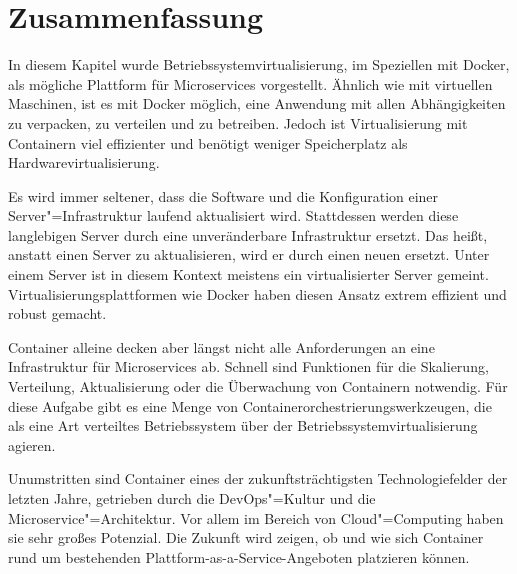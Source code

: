 \section{Zusammenfassung}

In diesem Kapitel wurde Betriebssystemvirtualisierung, im Speziellen mit Docker, als mögliche Plattform für Microservices vorgestellt. Ähnlich wie mit virtuellen Maschinen, ist es mit Docker möglich, eine Anwendung mit allen Abhängigkeiten zu verpacken, zu verteilen und zu betreiben. Jedoch ist Virtualisierung mit Containern viel effizienter und benötigt weniger Speicherplatz als Hardwarevirtualisierung.

Es wird immer seltener, dass die Software und die Konfiguration einer Server"=Infrastruktur laufend aktualisiert wird. Stattdessen werden diese langlebigen Server durch eine unveränderbare Infrastruktur ersetzt. Das heißt, anstatt einen Server zu aktualisieren, wird er durch einen neuen ersetzt. Unter einem Server ist in diesem Kontext meistens ein virtualisierter Server gemeint. Virtualisierungsplattformen wie Docker haben diesen Ansatz extrem effizient und robust gemacht.

Container alleine decken aber längst nicht alle Anforderungen an eine Infrastruktur für Microservices ab. Schnell sind Funktionen für die Skalierung, Verteilung, Aktualisierung oder die Überwachung von Containern notwendig. Für diese Aufgabe gibt es eine Menge von Containerorchestrierungswerkzeugen, die als eine Art verteiltes Betriebssystem über der Betriebssystemvirtualisierung agieren.

Unumstritten sind Container eines der zukunftsträchtigsten Technologiefelder der letzten Jahre, getrieben durch die DevOps"=Kultur und die Microservice"=Architektur. Vor allem im Bereich von Cloud"=Computing haben sie sehr großes Potenzial. Die Zukunft wird zeigen, ob und wie sich Container rund um bestehenden Plattform-as-a-Service-Angeboten platzieren können. 
